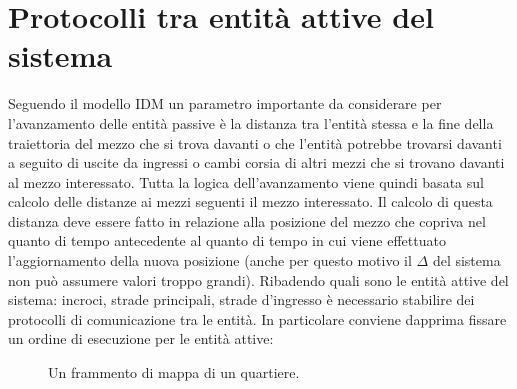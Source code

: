 \newpage
\section{Protocolli tra entità attive del sistema}
Seguendo il modello IDM un parametro importante da considerare per l'avanzamento delle entità passive è la distanza tra l'entità stessa e la fine della traiettoria del mezzo che si trova davanti o che l'entità potrebbe trovarsi davanti a seguito di uscite da ingressi o cambi corsia di altri mezzi che si trovano davanti al mezzo interessato. Tutta la logica dell'avanzamento viene quindi basata sul calcolo delle distanze ai mezzi seguenti il mezzo interessato. Il calcolo di questa distanza deve essere fatto in relazione alla posizione del mezzo che copriva nel quanto di tempo antecedente al quanto di tempo in cui viene effettuato l'aggiornamento della nuova posizione (anche per questo motivo il $\Delta$ del sistema non può assumere valori troppo grandi). Ribadendo quali sono le entità attive del sistema: incroci, strade principali, strade d'ingresso è necessario stabilire dei protocolli di comunicazione tra le entità. In particolare conviene dapprima fissare un ordine di esecuzione per le entità attive:

\begin{figure}[H] %
\caption{Un frammento di mappa di un quartiere.}
\label{fig:Un frammento di mappa di un quartiere}
\end{figure}

